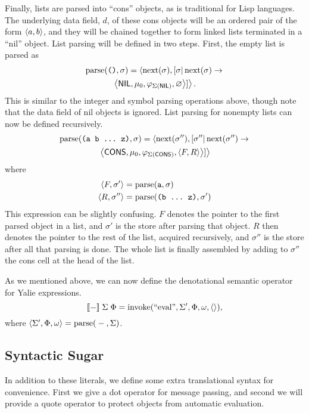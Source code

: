 \documentclass[twocolumn]{article}
\begin{document}
Finally, lists are parsed into ``cons'' objects, as is traditional for
Lisp languages. The underlying data field, $d$, of these cons objects
will be an ordered pair of the form $\left< a,b\right>$, and they will be
chained together to form linked lists terminated in a ``nil''
object. List parsing will be defined in two steps. First, the empty
list is parsed as
\begin{multline*}
  \operatorname{parse}(\texttt{()},\sigma) = \left<\operatorname{next}(\sigma),
  [\sigma|\operatorname{next}(\sigma) \rightarrow \right.\\
\left.\left<\mathsf{NIL}, \mu_0, \varphi_{\Sigma(\mathsf{NIL})}, \varnothing\right>]\right>.
\end{multline*}
This is similar to the integer and symbol parsing operations above,
though note that the data field of nil objects is ignored. List
parsing for nonempty lists can now be defined recursively.
\begin{multline*} \operatorname{parse}(\texttt{(a b \ldots\ z)},\sigma) = \left<
  \operatorname{next}(\sigma''),[\sigma''|\operatorname{next}(\sigma'')
  \rightarrow\right. \\\left.\left<\mathsf{CONS}, \mu_0,
  \varphi_{\Sigma(\mathsf{CONS})},
  \left< F, R \right> \right> ] \right>
\end{multline*}
where
\begin{align*}
  \left< F, \sigma' \right> &= \operatorname{parse}( \texttt{a}, \sigma ) \\
  \left< R, \sigma'' \right> &= \operatorname{parse}( \texttt{(b \ldots\ z)}, \sigma')
\end{align*}
This expression can be slightly confusing. $F$ denotes the pointer to
the first parsed object in a list, and $\sigma'$ is the store after
parsing that object. $R$ then denotes the pointer to the rest of the
list, acquired recursively, and $\sigma''$ is the store after all that
parsing is done. The whole list is finally assembled by adding to
$\sigma''$ the cons cell at the head of the list.

As we mentioned above, we can now define the denotational semantic
operator for Yalie expressions.
\[ [\![-]\!]\phantom{,}\Sigma\phantom{,}\Phi = \operatorname{invoke}(\text{``eval''},
\Sigma', \Phi, \omega, \left<\right>),\] where $\left< \Sigma', \Phi, \omega\right>
= \operatorname{parse}({}-{},\Sigma)$.

\subsection*{Syntactic Sugar}
In addition to these literals, we define some extra translational
syntax for convenience. First we give a dot operator for message
passing, and second we will provide a quote operator to protect
objects from automatic evaluation.
\end{document}
